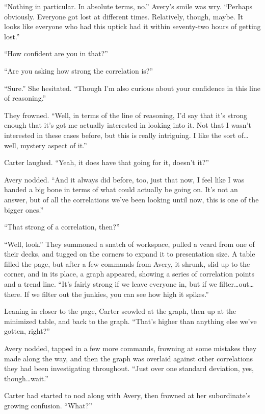 ``Nothing in particular. In absolute terms, no.'' Avery's smile was wry. ``Perhaps obviously. Everyone got lost at different times. Relatively, though, maybe. It looks like everyone who had this uptick had it within seventy-two hours of getting lost.''

``How confident are you in that?''

``Are you asking how strong the correlation is?''

``Sure.'' She hesitated. ``Though I'm also curious about your confidence in this line of reasoning.''

They frowned. ``Well, in terms of the line of reasoning, I'd say that it's strong enough that it's got me actually interested in looking into it. Not that I wasn't interested in these cases before, but this is really intriguing. I like the sort of\ldots{}well, mystery aspect of it.''

Carter laughed. ``Yeah, it does have that going for it, doesn't it?''

Avery nodded. ``And it always did before, too, just that now, I feel like I was handed a big bone in terms of what could actually be going on. It's not an answer, but of all the correlations we've been looking until now, this is one of the bigger ones.''

``That strong of a correlation, then?''

``Well, look.'' They summoned a snatch of workspace, pulled a vcard from one of their decks, and tugged on the corners to expand it to presentation size. A table filled the page, but after a few commands from Avery, it shrunk, slid up to the corner, and in its place, a graph appeared, showing a series of correlation points and a trend line. ``It's fairly strong if we leave everyone in, but if we filter\ldots{}out\ldots{}there. If we filter out the junkies, you can see how high it spikes.''

Leaning in closer to the page, Carter scowled at the graph, then up at the minimized table, and back to the graph. ``That's higher than anything else we've gotten, right?''

Avery nodded, tapped in a few more commands, frowning at some mistakes they made along the way, and then the graph was overlaid against other correlations they had been investigating throughout. ``Just over one standard deviation, yes, though\ldots{}wait.''

Carter had started to nod along with Avery, then frowned at her subordinate's growing confusion. ``What?''

